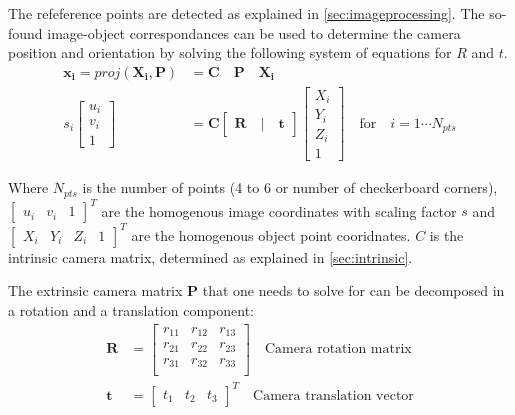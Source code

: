 The refeference points are detected as explained in \ref{sec:imageprocessing}. The so-found image-object correspondances can be used to determine the camera position and orientation by solving the following system of equations for $R$ and $t$.
\begin{align}
    \mathbf{x_i} = proj(\mathbf{X_i},\mathbf{P})& = \mathbf{C} \quad \mathbf{P} \quad \mathbf{X_i} \\
    s_i \begin{bmatrix} u_i \\ v_i \\ 1 \end{bmatrix} &= 
    \mathbf{C} \begin{bmatrix} \mathbf{R} \quad|\quad \mathbf{t} \end{bmatrix}
    \begin{bmatrix} X_i \\ Y_i \\  Z_i \\ 1 \end{bmatrix} \quad \text{for} \quad i=1\cdots N_{pts}
    \label{eq:projection}
\end{align}

Where $N_{pts}$ is the number of points (4 to 6 or number of checkerboard corners), 
$\begin{bmatrix} u_i & v_i & 1 \end{bmatrix} ^T$ are the homogenous image coordinates with scaling factor $s$ and $\begin{bmatrix} X_i & Y_i &  Z_i & 1 \end{bmatrix} ^T$ are the homogenous object point cooridnates. $C$ is the intrinsic camera matrix, determined as explained in \ref{sec:intrinsic}.

The extrinsic camera matrix $\mathbf{P}$ that one needs to solve for can be decomposed in a rotation and a translation component:
\begin{align}
    \mathbf{R} &= \begin{bmatrix} 
        r_{11} & r_{12} & r_{13} \\
        r_{21} & r_{22} & r_{23} \\
        r_{31} & r_{32} & r_{33} \\
    \end{bmatrix} \quad \text{Camera rotation matrix}\\
    \mathbf{t} &= \begin{bmatrix} 
        t_1 & t_2 & t_3
    \end{bmatrix} ^T \quad \text{Camera translation vector}
    \label{eq:solvepnp}
\end{align}

